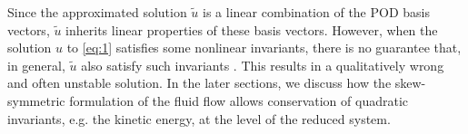 Since the approximated solution $\tilde u$ is a linear combination of the POD basis vectors, $\tilde u$ inherits linear properties of these basis vectors. However, when the solution $u$ to \eqref{eq:1} satisfies some nonlinear invariants, there is no guarantee that, in general, $\tilde u$ also satisfy such invariants \cite{doi:10.1137/140959602,doi:10.1137/140978922,doi:10.1137/17M1111991,MaboudiAfkham2018}. This results in a qualitatively wrong and often unstable solution. In the later sections, we discuss how the skew-symmetric formulation of the fluid flow allows conservation of quadratic invariants, e.g. the kinetic energy, at the level of the reduced system.
